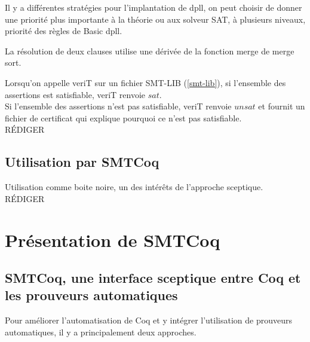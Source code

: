 \documentclass[11pt]{article}
\begin{document}
Il y a différentes stratégies pour l'implantation de dpll, on peut choisir de donner une priorité plus importante à la théorie ou aux solveur SAT, à plusieurs niveaux, priorité des règles de Basic dpll. 

La résolution de deux clauses utilise une dérivée de la fonction merge de merge sort.

Lorsqu'on appelle veriT sur un fichier SMT-LIB (\ref{smt-lib}), si l'ensemble des assertions est satisfiable, veriT renvoie $sat$. \\
Si l'ensemble des assertions n'est pas satisfiable, veriT renvoie $unsat$ et fournit un fichier de certificat qui explique pourquoi ce n'est pas satisfiable. \\


RÉDIGER

\subsection{Utilisation par SMTCoq}


Utilisation comme boite noire, un des intérêts de l'approche sceptique.\\

RÉDIGER


\newpage 
\section{Présentation de SMTCoq}

\subsection{SMTCoq, une interface sceptique entre Coq et les prouveurs automatiques}\label{sceptique_autarcique}

Pour améliorer l'automatisation de Coq et y intégrer l'utilisation de prouveurs automatiques, il y a principalement deux approches.
\end{document}
